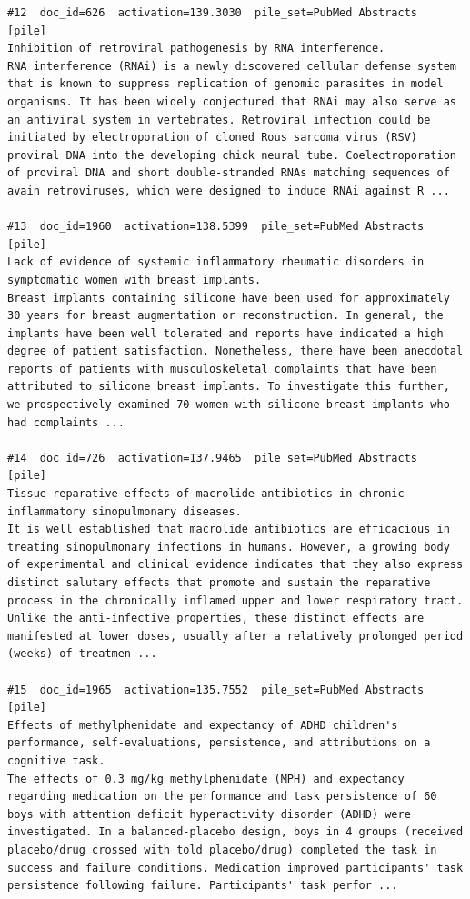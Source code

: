 \begin{verbatim}
#12  doc_id=626  activation=139.3030  pile_set=PubMed Abstracts  [pile]
Inhibition of retroviral pathogenesis by RNA interference.
RNA interference (RNAi) is a newly discovered cellular defense system that is known to suppress replication of genomic parasites in model organisms. It has been widely conjectured that RNAi may also serve as an antiviral system in vertebrates. Retroviral infection could be initiated by electroporation of cloned Rous sarcoma virus (RSV) proviral DNA into the developing chick neural tube. Coelectroporation of proviral DNA and short double-stranded RNAs matching sequences of avain retroviruses, which were designed to induce RNAi against R ...

#13  doc_id=1960  activation=138.5399  pile_set=PubMed Abstracts  [pile]
Lack of evidence of systemic inflammatory rheumatic disorders in symptomatic women with breast implants.
Breast implants containing silicone have been used for approximately 30 years for breast augmentation or reconstruction. In general, the implants have been well tolerated and reports have indicated a high degree of patient satisfaction. Nonetheless, there have been anecdotal reports of patients with musculoskeletal complaints that have been attributed to silicone breast implants. To investigate this further, we prospectively examined 70 women with silicone breast implants who had complaints ...

#14  doc_id=726  activation=137.9465  pile_set=PubMed Abstracts  [pile]
Tissue reparative effects of macrolide antibiotics in chronic inflammatory sinopulmonary diseases.
It is well established that macrolide antibiotics are efficacious in treating sinopulmonary infections in humans. However, a growing body of experimental and clinical evidence indicates that they also express distinct salutary effects that promote and sustain the reparative process in the chronically inflamed upper and lower respiratory tract. Unlike the anti-infective properties, these distinct effects are manifested at lower doses, usually after a relatively prolonged period (weeks) of treatmen ...

#15  doc_id=1965  activation=135.7552  pile_set=PubMed Abstracts  [pile]
Effects of methylphenidate and expectancy of ADHD children's performance, self-evaluations, persistence, and attributions on a cognitive task.
The effects of 0.3 mg/kg methylphenidate (MPH) and expectancy regarding medication on the performance and task persistence of 60 boys with attention deficit hyperactivity disorder (ADHD) were investigated. In a balanced-placebo design, boys in 4 groups (received placebo/drug crossed with told placebo/drug) completed the task in success and failure conditions. Medication improved participants' task persistence following failure. Participants' task perfor ...


\end{verbatim}
